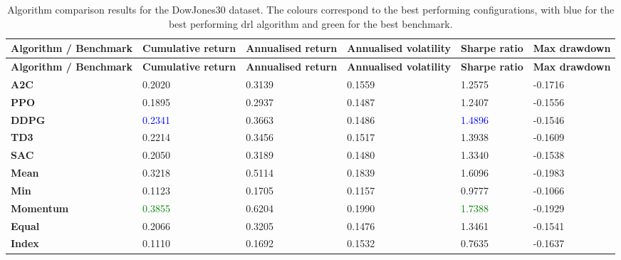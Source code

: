 \begin{longtable}{|p{2cm}|p{2.1cm}|p{2.1cm}|p{2.1cm}|p{1.5cm}|p{2cm}|}
    \caption{Algorithm comparison results for the DowJones30 dataset. The colours correspond to the best performing configurations, with blue for the best performing \acrshort{drl} algorithm and green for the best benchmark.}
    \label{tab:experiment_algorithms_dow30} 
    \\ 
    \hline
    \textbf{Algorithm / Benchmark} & \textbf{Cumulative return} & \textbf{Annualised return} & \textbf{Annualised volatility} & \textbf{Sharpe ratio} & \textbf{Max drawdown}  \\ \midrule
    \endfirsthead

    \hline
    \textbf{Algorithm / Benchmark} & \textbf{Cumulative return} & \textbf{Annualised return} & \textbf{Annualised volatility} & \textbf{Sharpe ratio} & \textbf{Max drawdown}  \\ \midrule
    \endhead

    \endfoot
    \hline

    \textbf{A2C} & 0.2020 & 0.3139 & 0.1559 & 1.2575 & -0.1716 \\ \hline
    \textbf{PPO} & 0.1895 & 0.2937 & 0.1487 & 1.2407 & -0.1556 \\ \hline
    \textbf{DDPG} & \textcolor{blue}{0.2341} & 0.3663 & 0.1486 & \textcolor{blue}{1.4896} & -0.1546 \\ \hline
    \textbf{TD3} & 0.2214 & 0.3456 & 0.1517 & 1.3938 & -0.1609 \\ \hline
    \textbf{SAC} & 0.2050 & 0.3189 & 0.1480 & 1.3340 & -0.1538 \\ \midrule
    \textbf{Mean} & 0.3218 & 0.5114 & 0.1839 & 1.6096 & -0.1983 \\ \hline
    \textbf{Min} & 0.1123 & 0.1705 & 0.1157 & 0.9777 & -0.1066 \\ \hline
    \textbf{Momentum} & \textcolor{green}{0.3855} & 0.6204 & 0.1990 & \textcolor{green}{1.7388} & -0.1929 \\ \hline
    \textbf{Equal} & 0.2066 & 0.3205 & 0.1476 & 1.3461 & -0.1541 \\ \hline
    \textbf{Index} & 0.1110 & 0.1692 & 0.1532 & 0.7635 & -0.1637 \\ \hline
\end{longtable}